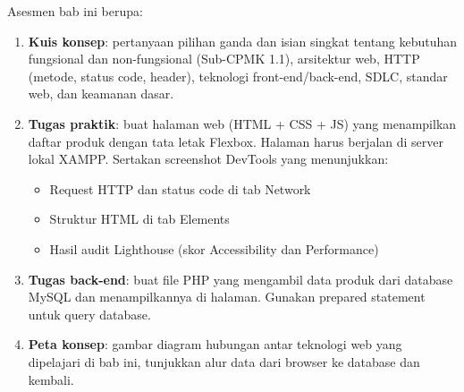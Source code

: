 \documentclass[../main.tex]{subfiles}
\begin{document}
\begin{asesmen}
Asesmen bab ini berupa:
\begin{enumerate}
  \item \textbf{Kuis konsep}: pertanyaan pilihan ganda dan isian singkat tentang kebutuhan fungsional dan non-fungsional (Sub-CPMK 1.1), arsitektur web, HTTP (metode, status code, header), teknologi front-end/back-end, SDLC, standar web, dan keamanan dasar.
  \item \textbf{Tugas praktik}: buat halaman web (HTML + CSS + JS) yang menampilkan daftar produk dengan tata letak Flexbox. Halaman harus berjalan di server lokal XAMPP. Sertakan screenshot DevTools yang menunjukkan:
  \begin{itemize}
    \item Request HTTP dan status code di tab Network
    \item Struktur HTML di tab Elements
    \item Hasil audit Lighthouse (skor Accessibility dan Performance)
  \end{itemize}
  \item \textbf{Tugas back-end}: buat file PHP yang mengambil data produk dari database MySQL dan menampilkannya di halaman. Gunakan prepared statement untuk query database.
  \item \textbf{Peta konsep}: gambar diagram hubungan antar teknologi web yang dipelajari di bab ini, tunjukkan alur data dari browser ke database dan kembali.
\end{enumerate}
\end{asesmen}
\end{document}
